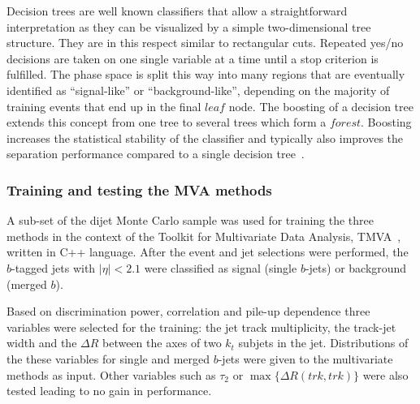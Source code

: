Decision trees %
are well known classifiers that allow a straightforward interpretation as they can be visualized by a simple two-dimensional tree structure. They are in this respect similar to rectangular cuts. 
Repeated yes/no decisions are taken on one single variable at a time until a stop criterion is fulfilled.  The phase space is split this way into many regions that are eventually identified as ``signal-like'' or ``background-like'', depending on the majority of training events that end up in the final $leaf$ node. The boosting of a decision tree extends this concept from one tree to several trees which form a $forest$.
Boosting increases the statistical stability of the classifier and typically also improves the separation performance compared to a single decision tree~\cite{QUINLAN1999497}. %


\subsubsection{Training and testing the MVA methods}

A sub-set of the dijet Monte Carlo sample was used for training the three methods in the context of the Toolkit for Multivariate Data Analysis, TMVA~\cite{Hocker:2007ht}, written in C++ language.  After the event and jet selections were performed, the $b$-tagged jets with $|\eta| < 2.1$ were classified as signal (single $b$-jets) or background (merged $b$). 

Based on discrimination power, correlation and pile-up dependence three variables were selected for the training: the jet track multiplicity, the track-jet width and the $\Delta R$ between the axes of two $k_t$ subjets in the jet.  Distributions of the these variables for single and merged $b$-jets were given to the multivariate methods as input. Other variables such as $\tau_2$ or $\max\{\Delta R(trk,trk)\}$ were also tested leading to no gain in performance.

